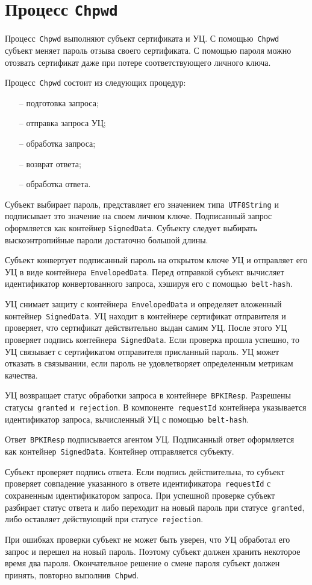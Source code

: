 \section{Процесс \texttt{Chpwd}}\label{PROCESSES.Chpwd}

Процесс~\texttt{Chpwd} выполняют субъект сертификата и УЦ.
С помощью~\texttt{Chpwd} субъект меняет пароль отзыва своего 
сертификата. С помощью пароля можно отозвать сертификат даже при потере 
соответствующего личного ключа.

Процесс~\texttt{Chpwd} состоит из следующих процедур:
\begin{itemize}
\item[--]
подготовка запроса;
\item[--]
отправка запроса УЦ;
\item[--]
обработка запроса;
\item[--]
возврат ответа;
\item[--]
обработка ответа.
\end{itemize}

Субъект выбирает пароль, представляет его значением типа~\texttt{UTF8String}
и подписывает это значение на своем личном ключе.
Подписанный запрос оформляется как контейнер \texttt{SignedData}.
%
Субъекту следует выбирать выскоэнтропийные пароли достаточно большой 
длины.

Субъект конвертует подписанный пароль на открытом ключе УЦ
и отправляет его УЦ в виде контейнера~\texttt{EnvelopedData}.
Перед отправкой субъект вычисляет идентификатор конвертованного запроса,
хэшируя его с помощью~\texttt{belt-hash}.

УЦ снимает защиту с контейнера~\texttt{EnvelopedData} и определяет 
вложенный контейнер~\texttt{SignedData}. УЦ находит в контейнере
сертификат отправителя и проверяет, что сертификат действительно 
выдан самим УЦ. После этого УЦ проверяет подпись 
контейнера~\texttt{SignedData}. Если проверка прошла успешно, то УЦ  
связывает с сертификатом отправителя присланный пароль. УЦ может отказать 
в связывании, если пароль не удовлетворяет определенным метрикам качества.

УЦ возвращает статус обработки запроса в контейнере~\texttt{BPKIResp}.
Разрешены статусы~\texttt{granted} и~\texttt{rejection}.
В компоненте~\texttt{requestId} контейнера указывается идентификатор 
запроса, вычисленный УЦ с помощью~\texttt{belt-hash}.

Ответ~\texttt{BPKIResp} подписывается агентом УЦ. 
Подписанный ответ оформляется как контейнер~\texttt{SignedData}. Контейнер 
отправляется субъекту.

Субъект проверяет подпись ответа. Если подпись действительна,
то субъект проверяет совпадение указанного в ответе 
идентификатора~\texttt{requestId} с сохраненным идентификатором запроса. 
При успешной проверке субъект разбирает статус ответа и либо переходит 
на новый пароль при статусе~\texttt{granted}, либо оставляет действующий
при статусе~\texttt{rejection}. 

При ошибках проверки субъект не может быть уверен, что УЦ обработал
его запрос и перешел на новый пароль. Поэтому субъект должен хранить  
некоторое время два пароля. Окончательное решение о смене пароля 
субъект должен принять, повторно выполнив~\texttt{Chpwd}.
